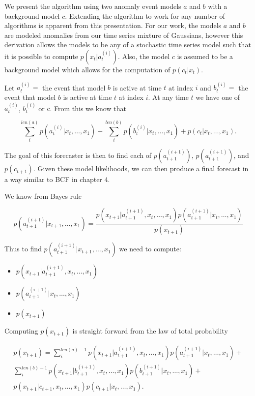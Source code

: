 We present the algorithm using two anomaly event models $a$ and $b$ with a background model $c$.  Extending the algorithm to work for any number of algorithms is apparent from this presentation.  For our work, the models $a$ and $b$ are modeled anomalies from our time series mixture of Gaussians, however this derivation allows the models to be any of a stochastic time series model such that it is possible to compute $p(x_{t} | a^{(i)}_{t})$.  Also, the model $c$ is assumed to be a background model which allows for the computation of $p(c_{t}|x_{t})$.  

Let $a_{t}^{(i)} = $ the event that model $b$ is active at time $t$ at index $i$ and $b_{t}^{(i)} = $ the event that model $b$ is active at time $t$ at index $i$.  At any time $t$ we have one of ${a^{(i)}_{t}}$, ${b^{(i)}_{t}}$ or $c$.  From this we know that 

\begin{equation}
\sum_{i}^{len(a)} p(a_{t}^{(i)}|x_{t}, \ldots, x_{1}) + \sum_{i}^{len(b)} p(b_{t}^{(i)}|x_{t}, \ldots, x_{1}) + p(c_{t}|x_{t}, \ldots, x_{1}).
\end{equation}

The goal of this forecaster is then to find each of $p(a_{t + 1}^{(i + 1)})$, $p(a_{t + 1}^{(i + 1)})$, and $p(c_{t + 1}).$  Given these model likelihoods, we can then produce a final forecast in a way similar to BCF in chapter 4.

We know from Bayes rule 

\begin {equation}
p(a_{t + 1}^{(i + 1)}|x_{t + 1}, \ldots, x_{1}) =
		\frac{p(x_{t + 1}|a^{(i + 1)}_{t + 1}, x_{t}, \ldots, x_{1}) p(a_{t + 1}^{(i + 1)}|x_{t}, \ldots, x_{1})}
	       {p(x_{t + 1})}
\end{equation}

Thus to find $p(a_{t + 1}^{(i + 1)}|x_{t + 1}, \ldots, x_{1})$ we need to compute:
\begin{itemize}
	\item $p(x_{t + 1}|a^{(i + 1)}_{t + 1}, x_{t}, \ldots, x_{1})$
	\item $p(a_{t + 1}^{(i + 1)}|x_{t}, \ldots, x_{1})$
	\item $p(x_{t + 1})$
\end{itemize} 

Computing $p(x_{t + 1})$ is straight forward from the law of total probability

\begin{equation}
	\begin{split}
		p(x_{t + 1}) = \sum_{i}^{len(a) - 1}p(x_{t + 1}|a_{t + 1}^{(i + 1)}, x_{t}, \ldots, x_{1})
						   p(a_{t + 1}^{(i + 1)}|x_{t}, \ldots, x_{1}) + \\
				      \sum_{i}^{len(b) - 1}p(x_{t + 1}|b_{t + 1}^{(i + 1)}, x_{t}, \ldots, x_{1}) 
						   p(b_{t + 1}^{(i + 1)}|x_{t}, \ldots, x_{1}) + \\
	        			      p(x_{t + 1}|c_{t + 1}, x_{t}, \ldots, x_{1})p(c_{t + 1}|x_{t}, \ldots, x_{1}).
	\end{split}
\end{equation}

